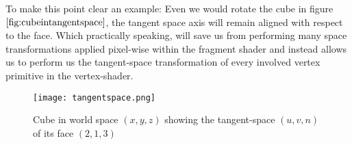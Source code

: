 To make this point clear an example: Even we would rotate the cube in figure $\ref{fig:cubeintangentspace}$, the tangent space axis will remain aligned with respect to the face. Which practically speaking, will save us from performing many space transformations applied pixel-wise within the fragment shader and instead allows us to perform us the tangent-space transformation of every involved vertex primitive in the vertex-shader.

\begin{figure}[H]
  \centering
  \texttt{[image: tangentspace.png]}
  \caption[Illustration of a Tangent Space]{Cube in world space $(x,y,z)$ showing the tangent-space $(u,v,n)$ of its face $(2,1,3)$}
  \label{fig:cubeintangentspace}
\end{figure}
